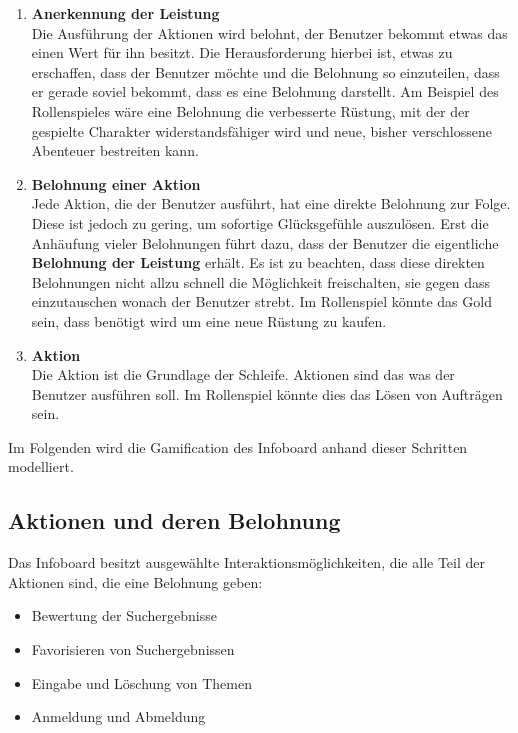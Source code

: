 \documentclass[12pt,twoside]{book}
\begin{document}
\begin{enumerate}
  \item \textbf{Anerkennung der Leistung} \\
  Die Ausführung der Aktionen wird belohnt, der Benutzer bekommt etwas das einen Wert für ihn besitzt. Die Herausforderung hierbei ist, etwas zu erschaffen, dass der Benutzer möchte und die Belohnung so einzuteilen, dass er gerade soviel bekommt, dass es eine Belohnung darstellt. Am Beispiel des Rollenspieles wäre eine Belohnung die verbesserte Rüstung, mit der der gespielte Charakter widerstandsfähiger wird und neue, bisher verschlossene Abenteuer bestreiten kann.
  \item \textbf{Belohnung einer Aktion}\\
  Jede Aktion, die der Benutzer ausführt, hat eine direkte Belohnung zur Folge. Diese ist jedoch zu gering, um sofortige Glücksgefühle auszulösen. Erst die  Anhäufung vieler Belohnungen führt dazu, dass der Benutzer die eigentliche \textbf{Belohnung der Leistung} erhält. Es ist zu beachten, dass diese direkten Belohnungen nicht allzu schnell die Möglichkeit freischalten, sie gegen dass einzutauschen wonach der Benutzer strebt. Im Rollenspiel könnte das Gold sein, dass benötigt wird um eine neue Rüstung zu kaufen.
  \item \textbf{Aktion}\\
  Die Aktion ist die Grundlage der Schleife. Aktionen sind das was der Benutzer ausführen soll. Im Rollenspiel könnte dies das Lösen von Aufträgen sein.
\end{enumerate}

Im Folgenden wird die Gamification des Infoboard anhand dieser Schritten modelliert.

\subsection{Aktionen und deren Belohnung}

Das Infoboard besitzt ausgewählte Interaktionsmöglichkeiten, die alle Teil der Aktionen sind, die eine Belohnung geben:

\begin{itemize}
  \item Bewertung der Suchergebnisse
  \item Favorisieren von Suchergebnissen
  \item Eingabe und Löschung von Themen
  \item Anmeldung und Abmeldung
\end{itemize}
\end{document}
